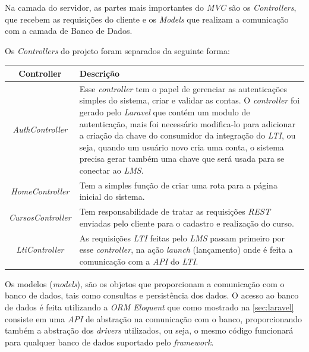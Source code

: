Na camada do servidor, as partes mais importantes do \textit{MVC} são os \textit{Controllers}, que recebem as requisições do cliente e os \textit{Models} que realizam a comunicação com a camada de Banco de Dados.

Os \textit{Controllers} do projeto foram separados da seguinte forma:

\begin{tabular}{|c|p{10cm}|}
    \hline \textbf{Controller} & \textbf{Descrição} \\ 
    \hline \textit{AuthController} & 
        Esse \textit{controller} tem o papel de gerenciar as autenticações simples do sistema, criar e validar as contas. O \textit{controller} foi gerado pelo \textit{Laravel} que contém um modulo de autenticação, mais foi necessário modifica-lo para adicionar a criação da chave do consumidor da integração do \textit{LTI}, ou seja, quando um usuário novo cria uma conta, o sistema precisa gerar também uma chave que será usada para se conectar ao \textit{LMS}.
     \\ 
    \hline \textit{HomeController} & 
        Tem a simples função de criar uma rota para a página inicial do sistema.
     \\ 
    \hline \textit{CursosController} & 
        Tem responsabilidade de tratar as requisições \textit{REST} enviadas pelo cliente para o cadastro e realização do curso.
     \\ 
    \hline \textit{LtiController} & 
        As requisições \textit{LTI} feitas pelo \textit{LMS} passam primeiro por esse \textit{controller}, na ação \textit{launch} (lançamento) onde é feita a comunicação com a \textit{API} do \textit{LTI}.
     \\ 
    \hline 
\end{tabular} 

Os modelos (\textit{models}), são os objetos que proporcionam a comunicação com o banco de dados, tais como consultas e persistência dos dados. O acesso ao banco de dados é feita utilizando a \textit{ORM Eloquent} que como mostrado na \autoref{sec:laravel} consiste em uma \textit{API} de abstração na comunicação com o banco, proporcionando também a abstração dos \textit{drivers} utilizados, ou seja, o mesmo código funcionará para qualquer banco de dados suportado pelo \textit{framework}.

